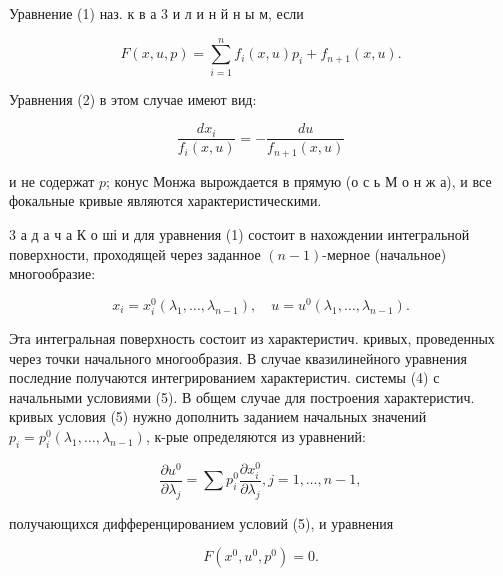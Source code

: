 \documentclass[10pt]{article}
\begin{document}
Уравнение (1) наз. к в а 3 и л и н й н ы м, если



\[

F(x, u, p)=\sum_{i=1}^{n} f_{i}(x, u) p_{i}+f_{n+1}(x, u) .

\]



Уравнения (2) в этом случае имеют вид:



\[

\frac{d x_{i}}{f_{i}(x, u)}=-\frac{d u}{f_{n+1}(x, u)}

\]



и не содержат $p$; конус Монжа вырождается в прямую (о с ь М о н ж а), и все фокальные кривые являются характеристическими.



3 а д а ч а К о ші и для уравнения (1) состоит в нахождении интегральной поверхности, проходящей через заданное $(n-1)$-мерное (начальное) многообразие:



\[

x_{i}=x_{i}^{0}\left(\lambda_{1}, \ldots, \lambda_{n-1}\right), \quad u=u^{0}\left(\lambda_{1}, \ldots, \lambda_{n-1}\right) .

\]



Эта интегральная поверхность состоит из характеристич. кривых, проведенных через точки начального многообразия. В случае квазилинейного уравнения последние получаются интегрированием характеристич. системы (4) с начальными условиями (5). В общем случае для построения характеристич. кривых условия (5) нужно дополнить заданием начальных значений $p_{i}=p_{i}^{0}\left(\lambda_{1}, \ldots, \lambda_{n-1}\right)$, к-рые определяются из уравнений:



\[

\frac{\partial u^{0}}{\partial \lambda_{j}}=\sum p_{i}^{0} \frac{\partial x_{i}^{0}}{\partial \lambda_{j}}, j=1, \ldots, n-1,

\]



получающихся дифференцированием условий (5), и уравнения



\[

F\left(x^{0}, u^{0}, p^{0}\right)=0 .

\]
\end{document}
